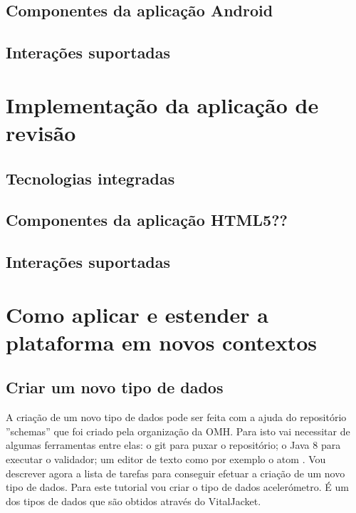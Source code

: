 \subsection{Componentes da aplicação Android}
\subsection{Interações suportadas }


\section{Implementação da aplicação de revisão}
\subsection{Tecnologias integradas}


\subsection{Componentes da aplicação HTML5??}

\subsection{Interações suportadas }






\section{Como aplicar e estender a plataforma em novos contextos}


\subsection{Criar um novo tipo de dados}

A criação de um novo tipo de dados pode ser feita com a ajuda do repositório ''schemas'' \cite{schemas-rep} que foi criado pela organização da \gls{OMH}. Para isto vai necessitar de algumas ferramentas entre elas: o git \cite{git-install} para puxar o repositório; o Java 8 \cite{java-overview} para executar o validador; um editor de texto como por exemplo o atom \cite{atom-install}. Vou descrever agora a lista de tarefas para conseguir efetuar a criação de um novo tipo de dados. Para este tutorial vou criar o tipo de dados acelerómetro. É um dos tipos de dados que são obtidos através do VitalJacket.

